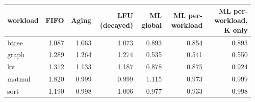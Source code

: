 \begin{tabular}{lrrrrrr}
\toprule
workload & FIFO & Aging & LFU (decayed) & ML global & ML per-workload & ML per-workload, K only \\
\midrule
btree & 1.087 & 1.063 & 1.073 & 0.893 & 0.854 & 0.893 \\
graph & 1.289 & 1.264 & 1.274 & 0.535 & 0.541 & 0.550 \\
kv & 1.312 & 1.133 & 1.187 & 0.878 & 0.875 & 0.924 \\
matmul & 1.820 & 0.999 & 0.999 & 1.115 & 0.973 & 0.999 \\
sort & 1.190 & 0.998 & 1.006 & 0.977 & 0.933 & 0.998 \\
\bottomrule
\end{tabular}
